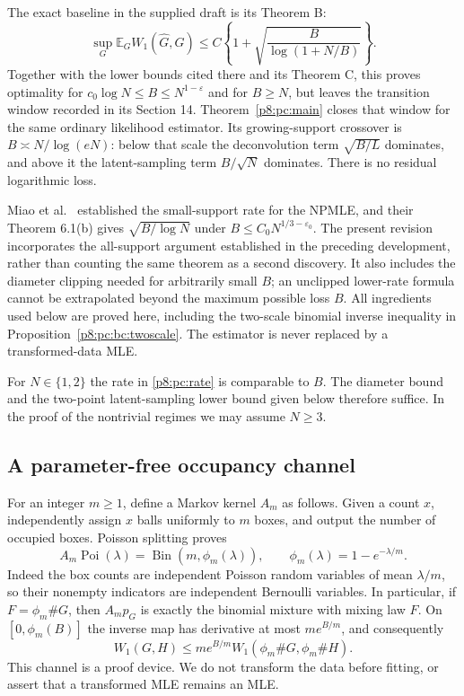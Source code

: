 \documentclass[11pt,a4paper]{article}
\theoremstyle{definition}
\theoremstyle{remark}
\numberwithin{equation}{section}
\begin{document}
The exact baseline in the supplied draft is its Theorem B:
\[
 \sup_G\mathbb E_G W_1(\widehat G,G)
 \le C\left\{1+\sqrt{\frac{B}{\log(1+N/B)}}\right\}.
\]
Together with the lower bounds cited there and its Theorem C, this
proves optimality for $c_0\log N\le B\le N^{1-\varepsilon}$ and
for $B\ge N$, but leaves the transition window recorded in its
Section 14. Theorem~\ref{p8:pc:main} closes that window for the same
ordinary likelihood estimator. Its growing-support crossover is
$B\asymp N/\log(eN)$: below that scale the deconvolution term
$\sqrt{B/L}$ dominates, and above it the latent-sampling term
$B/\sqrt N$ dominates. There is no residual logarithmic loss.

Miao et al.\ \cite[Theorem 6.1(a)]{p8:PC_Miao2021} established the
small-support rate for the NPMLE, and their Theorem 6.1(b) gives
$\sqrt{B/\log N}$ under $B\le C_0N^{1/3-\varepsilon_0}$.
The present revision incorporates the all-support argument established
in the preceding development, rather than counting the same theorem
as a second discovery. It also includes the diameter clipping needed
for arbitrarily small $B$; an unclipped lower-rate formula cannot be
extrapolated beyond the maximum possible loss $B$.
All ingredients used below are proved here, including the two-scale
binomial inverse inequality in Proposition~\ref{p8:pc:bc:twoscale}.
The estimator is never replaced by a transformed-data MLE.

For $N\in\{1,2\}$ the rate in \eqref{p8:pc:rate} is comparable to $B$.
The diameter bound and the two-point latent-sampling lower bound given
below therefore suffice. In the proof of the nontrivial regimes we
may assume $N\ge3$.

\subsection{A parameter-free occupancy channel}

For an integer $m\ge1$, define a Markov kernel $A_m$ as follows.  Given
a count $x$, independently assign $x$ balls uniformly to $m$ boxes,
and output the number of occupied boxes.  Poisson splitting proves
\begin{equation}\label{p8:pc:occupancy}
 A_m\operatorname{Poi}(\lambda)
 =\operatorname{Bin}(m,\phi_m(\lambda)),\qquad
 \phi_m(\lambda)=1-e^{-\lambda/m}.
\end{equation}
Indeed the box counts are independent Poisson random variables of
mean $\lambda/m$, so their nonempty indicators are independent
Bernoulli variables.  In particular, if $F=\phi_m\#G$, then
$A_mp_G$ is exactly the binomial mixture with mixing law $F$.
On $[0,\phi_m(B)]$ the inverse map has derivative at most
$m e^{B/m}$, and consequently
\begin{equation}\label{p8:pc:backmap}
 W_1(G,H)\le m e^{B/m}
                 W_1(\phi_m\#G,\phi_m\#H).
\end{equation}
This channel is a proof device.  We do not transform the data before
fitting, or assert that a transformed MLE remains an MLE.
\end{document}
